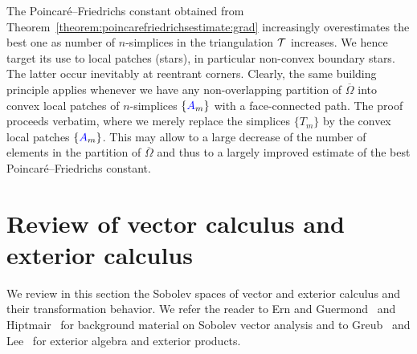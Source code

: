 \documentclass[10pt,a4paper]{article}
\begin{document}
\begin{remark}
    The Poincar\'e--Friedrichs constant obtained from Theorem~\ref{theorem:poincarefriedrichsestimate:grad} increasingly overestimates the best one as number of $n$-simplices in the triangulation ${\mathcal T}$ increases. We hence target its use to local patches (stars), in particular non-convex boundary stars. The latter occur inevitably at reentrant corners. Clearly, the same building principle applies whenever we have any non-overlapping partition of $\overline \Omega$ into convex local patches of $n$-simplices $\{ {\color{blue}A}_m \}$ with a face-connected path. The proof proceeds verbatim, where we merely replace the simplices $\{ T_{m} \}$ by the convex local patches $\{ {\color{blue}A}_m \}$. This may allow to a large decrease of the number of elements in the partition of $\overline \Omega$ and thus to a largely improved estimate of the best Poincar\'e--Friedrichs constant. 
\end{remark}



    























\section{Review of vector calculus and exterior calculus}\label{section:calculus}


We review in this section the Sobolev spaces of vector and exterior calculus and their transformation behavior. We refer the reader to Ern and Guermond~\cite{ern2021finite} and Hiptmair~\cite{hiptmair2002finite} for background material on Sobolev vector analysis and to Greub~\cite{greub1967multilinear} and Lee~\cite{lee2012smooth} for exterior algebra and exterior products. 
\end{document}

